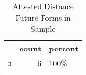\begin{table}[htbp!]
\centering
\caption{Attested Distance Future Forms in Sample}
\label{table:distfut_front}
\begin{tabular}{lrl}
\toprule
{} &  count & percent \\
\midrule
\texthebrew{ב} &      6 &    100\% \\
\bottomrule
\end{tabular}
\end{table}
